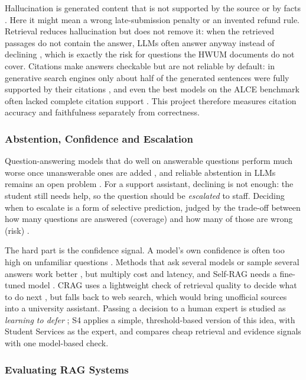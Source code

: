 \documentclass[12pt,nonacm,acmlarge,titlepage,screen]{acmart}
\begin{document}
Hallucination is generated content that is not supported by the source or by facts \cite{ji2023survey}. Here it might mean a wrong late-submission penalty or an invented refund rule. Retrieval reduces hallucination but does not remove it: when the retrieved passages do not contain the answer, LLMs often answer anyway instead of declining \cite{chen2024rgb}, which is exactly the risk for questions the HWUM documents do not cover. Citations make answers checkable but are not reliable by default: in generative search engines only about half of the generated sentences were fully supported by their citations \cite{liu2023verifiability}, and even the best models on the ALCE benchmark often lacked complete citation support \cite{gao2023alce}. This project therefore measures citation accuracy and faithfulness separately from correctness.

\subsubsection{Abstention, Confidence and Escalation} \label{sec:back_abst}

Question-answering models that do well on answerable questions perform much worse once unanswerable ones are added \cite{rajpurkar2018squad2}, and reliable abstention in LLMs remains an open problem \cite{wen2025know}. For a support assistant, declining is not enough: the student still needs help, so the question should be \emph{escalated} to staff. Deciding when to escalate is a form of selective prediction, judged by the trade-off between how many questions are answered (coverage) and how many of those are wrong (risk) \cite{geifman2017selective}.

The hard part is the confidence signal. A model's own confidence is often too high on unfamiliar questions \cite{kamath2020selective}. Methods that ask several models or sample several answers work better \cite{feng2024abstain}, but multiply cost and latency, and Self-RAG needs a fine-tuned model \cite{asai2024selfrag}. CRAG uses a lightweight check of retrieval quality to decide what to do next \cite{yan2024crag}, but falls back to web search, which would bring unofficial sources into a university assistant. Passing a decision to a human expert is studied as \emph{learning to defer} \cite{mozannar2020defer}; S4 applies a simple, threshold-based version of this idea, with Student Services as the expert, and compares cheap retrieval and evidence signals with one model-based check.

\subsubsection{Evaluating RAG Systems} \label{sec:back_eval}
\end{document}
